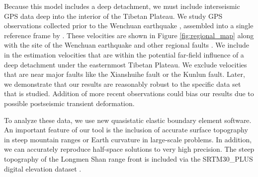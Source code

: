 \documentclass[12pt]{article}
\begin{document}
Because this model includes a deep detachment, we must include interseismic GPS data deep into the interior of the Tibetan Plateau. We study GPS observations collected prior to the Wenchuan earthquake \citep{apel06,Banerjee2008,calais06, gan07, vigny03}, assembled into a single reference frame by \citet{Loveless2011}. These velocities are shown in Figure \ref{fig:regional_map} along with the site of the Wenchuan earthquake and other regional faults \citep{Taylor09}. We include in the estimation velocities that are within the potential far-field influence of a deep detachment under the easternmost Tibetan Plateau. We exclude velocities that are near major faults like the Xianshuihe fault or the Kunlun fault. Later, we demonstrate that our results are reasonably robust to the specific data set that is studied. Addition of more recent observations could bias our results due to possible postseismic transient deformation.

To analyze these data, we use new quasistatic elastic boundary element software. An important feature of our tool is the inclusion of accurate surface topography in steep mountain ranges or Earth curvature in large-scale problems. In addition, we can accurately reproduce half-space solutions to very high precision. The steep topography of the Longmen Shan range front is included via the SRTM30\_PLUS digital elevation dataset \citep{Becker2009}.
\end{document}
